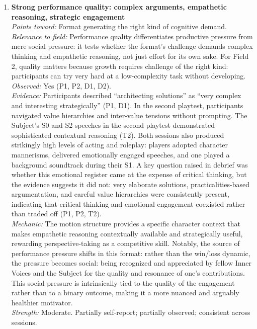 \begin{enumerate}
\item \textbf{Strong performance quality: complex arguments, empathetic reasoning, strategic engagement}\\
\textit{Points toward:} Format generating the right kind of cognitive demand.\\
\textit{Relevance to field:} Performance quality differentiates productive pressure from mere social pressure: it tests whether the format's challenge demands complex thinking and empathetic reasoning, not just effort for its own sake. For Field 2, quality matters because growth requires challenge of the right kind: participants can try very hard at a low-complexity task without developing.\\
\textit{Observed:} Yes (P1, P2, D1, D2).\\
\textit{Evidence:} Participants described ``architecting solutions'' as ``very complex and interesting strategically'' (P1, D1). In the second playtest, participants navigated value hierarchies and inter-value tensions without prompting. The Subject's S0 and S2 speeches in the second playtest demonstrated sophisticated contextual reasoning (T2). Both sessions also produced strikingly high levels of acting and roleplay: players adopted character mannerisms, delivered emotionally engaged speeches, and one played a background soundtrack during their S1. A key question raised in debrief was whether this emotional register came at the expense of critical thinking, but the evidence suggests it did not: very elaborate solutions, practicalities-based argumentation, and careful value hierarchies were consistently present, indicating that critical thinking and emotional engagement coexisted rather than traded off (P1, P2, T2).\\
\textit{Mechanic:} The motion structure provides a specific character context that makes empathetic reasoning contextually available and strategically useful, rewarding perspective-taking as a competitive skill. Notably, the source of performance pressure shifts in this format: rather than the win/loss dynamic, the pressure becomes social: being recognized and appreciated by fellow Inner Voices and the Subject for the quality and resonance of one's contributions. This social pressure is intrinsically tied to the quality of the engagement rather than to a binary outcome, making it a more nuanced and arguably healthier motivator.\\
\textit{Strength:} Moderate. Partially self-report; partially observed; consistent across sessions.


\end{enumerate}
